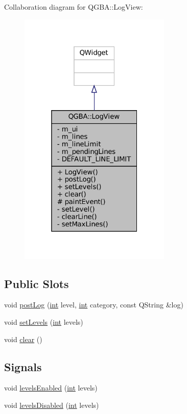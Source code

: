 Collaboration diagram for Q\+G\+BA\+:\+:Log\+View\+:
\nopagebreak
\begin{figure}[H]
\begin{center}
\leavevmode
\includegraphics[width=205pt]{class_q_g_b_a_1_1_log_view__coll__graph}
\end{center}
\end{figure}
\subsection*{Public Slots}
\begin{DoxyCompactItemize}
\item 
void \mbox{\hyperlink{class_q_g_b_a_1_1_log_view_ac55c68cf058ed26900803ad7bec30445}{post\+Log}} (\mbox{\hyperlink{ioapi_8h_a787fa3cf048117ba7123753c1e74fcd6}{int}} level, \mbox{\hyperlink{ioapi_8h_a787fa3cf048117ba7123753c1e74fcd6}{int}} category, const Q\+String \&log)
\item 
void \mbox{\hyperlink{class_q_g_b_a_1_1_log_view_a813aa9ea6e209b95f0b467610b528e08}{set\+Levels}} (\mbox{\hyperlink{ioapi_8h_a787fa3cf048117ba7123753c1e74fcd6}{int}} levels)
\item 
void \mbox{\hyperlink{class_q_g_b_a_1_1_log_view_af5262551d0e5839cbc13b53c36574bf0}{clear}} ()
\end{DoxyCompactItemize}
\subsection*{Signals}
\begin{DoxyCompactItemize}
\item 
void \mbox{\hyperlink{class_q_g_b_a_1_1_log_view_a57c60f4751bc52c34c3126ff5ab8ac27}{levels\+Enabled}} (\mbox{\hyperlink{ioapi_8h_a787fa3cf048117ba7123753c1e74fcd6}{int}} levels)
\item 
void \mbox{\hyperlink{class_q_g_b_a_1_1_log_view_a7f3fe25b1a984eb71814990bbf4a8358}{levels\+Disabled}} (\mbox{\hyperlink{ioapi_8h_a787fa3cf048117ba7123753c1e74fcd6}{int}} levels)
\end{DoxyCompactItemize}
